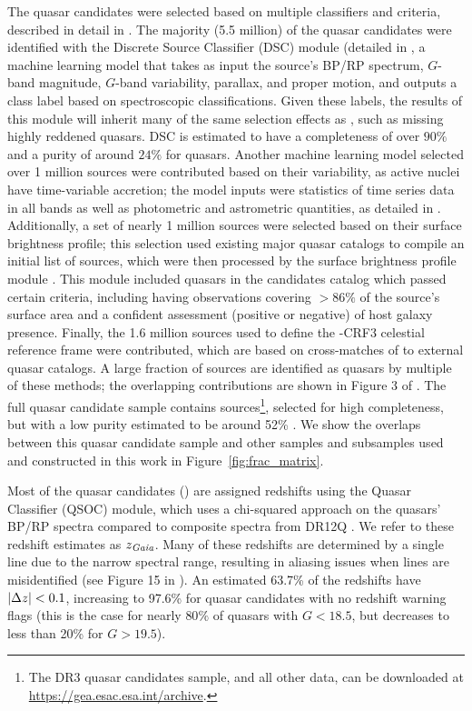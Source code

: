 The quasar candidates were selected based on multiple classifiers and criteria, described in detail in \cite{gaia_collab_gaia_2022}.
The majority (5.5 million) of the quasar candidates were identified with the Discrete Source Classifier (DSC) module (detailed in \cite{delchambre_gaia_2022}, a machine learning model that takes as input the source's BP/RP spectrum, $G$-band magnitude, $G$-band variability, parallax, and proper motion, and outputs a class label based on \SDSS spectroscopic classifications.
Given these \SDSS labels, the results of this module will inherit many of the same selection effects as \SDSS, such as missing highly reddened quasars.
DSC is estimated to have a completeness of over $90\%$ and a purity of around $24\%$ for quasars.
Another machine learning model selected over 1 million sources were contributed based on their variability, as active nuclei have time-variable accretion; the model inputs were statistics of time series data in all \Gaia bands as well as photometric and astrometric quantities, as detailed in \cite{rimoldini_gaia_2023}. 
Additionally, a set of nearly 1 million sources were selected based on their surface brightness profile; this selection used existing major quasar catalogs to compile an initial list of sources, which were then processed by the \Gaia surface brightness profile module \cite{ducourant_gaia_2022}.
This module included quasars in the candidates catalog which passed certain criteria, including having \Gaia observations covering $>86\%$ of the source's surface area and a confident assessment (positive or negative) of host galaxy presence.
Finally, the 1.6 million sources used to define the \Gaia-CRF3 celestial reference frame were contributed, which are based on cross-matches of \Gaia to external quasar catalogs.
A large fraction of sources are identified as quasars by multiple of these methods; the overlapping contributions are shown in Figure 3 of \cite{gaia_collab_gaia_2022}.
The full quasar candidate sample contains  sources\footnote{The \Gaia DR3 quasar candidates sample, and all other \Gaia data, can be downloaded at \url{https://gea.esac.esa.int/archive}.}, selected for high completeness, but with a low purity estimated to be around 52\% \citep{gaia_collab_gaia_2022}.
We show the overlaps between this \Gaia quasar candidate sample and other samples and subsamples used and constructed in this work in Figure~\ref{fig:frac_matrix}.

Most of the quasar candidates () are assigned redshifts using the Quasar Classifier (QSOC) module, which uses a chi-squared approach on the quasars' BP/RP spectra compared to composite spectra from \SDSS DR12Q \citep{delchambre_gaia_2022}.
We refer to these \Gaia redshift estimates as $z_\mathrm{\emph{Gaia}}$.
Many of these redshifts are determined by a single line due to the narrow spectral range, resulting in aliasing issues when lines are misidentified (see Figure 15 in \cite{delchambre_gaia_2022}).
An estimated 63.7\% of the redshifts have $|\Delta z| < 0.1$, increasing to 97.6\% for quasar candidates with no redshift warning flags (this is the case for nearly $80\%$ of quasars with $G<18.5$, but decreases to less than 20\% for $G>19.5$).

